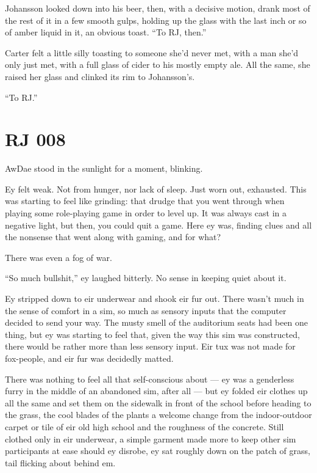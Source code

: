 Johansson looked down into his beer, then, with a decisive motion, drank most of the rest of it in a few smooth gulps, holding up the glass with the last inch or so of amber liquid in it, an obvious toast. ``To RJ, then.''

Carter felt a little silly toasting to someone she'd never met, with a man she'd only just met, with a full glass of cider to his mostly empty ale. All the same, she raised her glass and clinked its rim to Johansson's.

``To RJ.''

\chapter*{RJ 008}

AwDae stood in the sunlight for a moment, blinking.

Ey felt weak. Not from hunger, nor lack of sleep. Just worn out, exhausted. This was starting to feel like grinding: that drudge that you went through when playing some role-playing game in order to level up. It was always cast in a negative light, but then, you could quit a game. Here ey was, finding clues and all the nonsense that went along with gaming, and for what?

There was even a fog of war.

``So much bullshit,'' ey laughed bitterly. No sense in keeping quiet about it.

Ey stripped down to eir underwear and shook eir fur out. There wasn't much in the sense of comfort in a sim, so much as sensory inputs that the computer decided to send your way. The musty smell of the auditorium seats had been one thing, but ey was starting to feel that, given the way this sim was constructed, there would be rather more than less sensory input. Eir tux was not made for fox-people, and eir fur was decidedly matted.

There was nothing to feel all that self-conscious about --- ey was a genderless furry in the middle of an abandoned sim, after all --- but ey folded eir clothes up all the same and set them on the sidewalk in front of the school before heading to the grass, the cool blades of the plants a welcome change from the indoor-outdoor carpet or tile of eir old high school and the roughness of the concrete. Still clothed only in eir underwear, a simple garment made more to keep other sim participants at ease should ey disrobe, ey sat roughly down on the patch of grass, tail flicking about behind em.

